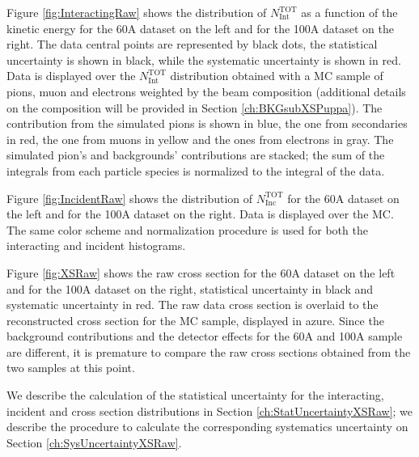 Figure \ref{fig:InteractingRaw} shows the distribution of  $N^{\text{TOT}}_{\text{Int}}$  as a function of the kinetic energy for the 60A dataset on the left and for the 100A dataset on the right. The data central points are represented by black dots, the statistical uncertainty is shown in black, while the systematic uncertainty is shown in red. Data is displayed over the $N^{\text{TOT}}_{\text{Int}}$  distribution obtained with a MC sample of pions, muon and electrons weighted by the beam composition (additional details on the composition will be provided in Section \ref{ch:BKGsubXSPuppa}). The contribution from the simulated pions is shown in blue, the one from secondaries in red, the one from muons in yellow and the ones from electrons in gray. 
The simulated pion's and backgrounds' contributions are stacked; the sum of the integrals from each particle species is normalized to the integral of the data.
 
Figure \ref{fig:IncidentRaw} shows the distribution of  $N^{\text{TOT}}_{\text{Inc}}$   for the 60A dataset on the left and for the 100A dataset on the right. Data is displayed over the MC. The same color scheme and normalization procedure is used for both the interacting and incident histograms. 


Figure \ref{fig:XSRaw} shows the raw cross section for the 60A dataset on the left and for the 100A dataset on the right, statistical uncertainty in black and systematic uncertainty in red. The raw data cross section is overlaid to the reconstructed cross section for the MC sample, displayed in azure. Since the background contributions and the detector effects for the 60A and 100A sample are different, it is premature to compare the raw cross sections obtained from the two samples at this point.

We describe the calculation of the statistical uncertainty for the interacting, incident and cross section distributions in Section \ref{ch:StatUncertaintyXSRaw}; we describe the procedure to calculate the corresponding systematics uncertainty on Section \ref{ch:SysUncertaintyXSRaw}.

